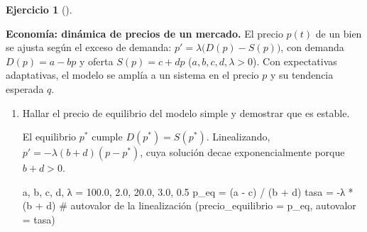 \documentclass[
  spanish,
  a4paper,
]{scrreport}
\newenvironment{Shaded}{\begin{snugshade}}{\end{snugshade}}
\newcommand{\CommentTok}[1]{\textcolor[rgb]{0.37,0.37,0.37}{#1}}
\newcommand{\FloatTok}[1]{\textcolor[rgb]{0.68,0.00,0.00}{#1}}
\newcommand{\NormalTok}[1]{\textcolor[rgb]{0.00,0.23,0.31}{#1}}
\newcommand{\OperatorTok}[1]{\textcolor[rgb]{0.37,0.37,0.37}{#1}}
\theoremstyle{definition}
\newtheorem{exercise}{Ejercicio}[chapter]
\theoremstyle{remark}
\begin{document}
\begin{exercise}[]\protect\hypertarget{exr-dinamica-mercado}{}\label{exr-dinamica-mercado}

\textbf{Economía: dinámica de precios de un mercado.} El precio \(p(t)\)
de un bien se ajusta según el exceso de demanda:
\(p' = \lambda\big(D(p) - S(p)\big)\), con demanda \(D(p) = a - b p\) y
oferta \(S(p) = c + d p\) (\(a,b,c,d,\lambda > 0\)). Con expectativas
adaptativas, el modelo se amplía a un sistema en el precio \(p\) y su
tendencia esperada \(q\).

\begin{enumerate}
\def\labelenumi{\alph{enumi}.}
\item
  Hallar el precio de equilibrio del modelo simple y demostrar que es
  estable.

  \begin{tcolorbox}[enhanced jigsaw, arc=.35mm, bottomrule=.15mm, bottomtitle=1mm, breakable, colback=white, colbacktitle=quarto-callout-note-color!10!white, colframe=quarto-callout-note-color-frame, coltitle=black, left=2mm, leftrule=.75mm, opacityback=0, opacitybacktitle=0.6, rightrule=.15mm, title=\textcolor{quarto-callout-note-color}{\faInfo}\hspace{0.5em}{Ayuda}, titlerule=0mm, toprule=.15mm, toptitle=1mm]

  El equilibrio \(p^*\) cumple \(D(p^*) = S(p^*)\). Linealizando,
  \(p' = -\lambda(b+d)(p - p^*)\), cuya solución decae exponencialmente
  porque \(b + d > 0\).

  \end{tcolorbox}

  \begin{tcolorbox}[enhanced jigsaw, arc=.35mm, bottomrule=.15mm, bottomtitle=1mm, breakable, colback=white, colbacktitle=quarto-callout-tip-color!10!white, colframe=quarto-callout-tip-color-frame, coltitle=black, left=2mm, leftrule=.75mm, opacityback=0, opacitybacktitle=0.6, rightrule=.15mm, title=\textcolor{quarto-callout-tip-color}{\faLightbulb}\hspace{0.5em}{Solución}, titlerule=0mm, toprule=.15mm, toptitle=1mm]

\begin{Shaded}
\begin{Highlighting}[]
\NormalTok{a, b, c, d, λ }\OperatorTok{=} \FloatTok{100.0}\NormalTok{, }\FloatTok{2.0}\NormalTok{, }\FloatTok{20.0}\NormalTok{, }\FloatTok{3.0}\NormalTok{, }\FloatTok{0.5}
\NormalTok{p\_eq }\OperatorTok{=}\NormalTok{ (a }\OperatorTok{{-}}\NormalTok{ c) }\OperatorTok{/}\NormalTok{ (b }\OperatorTok{+}\NormalTok{ d)}
\NormalTok{tasa }\OperatorTok{=} \OperatorTok{{-}}\NormalTok{λ }\OperatorTok{*}\NormalTok{ (b }\OperatorTok{+}\NormalTok{ d)          }\CommentTok{\# autovalor de la linealización}
\NormalTok{(precio\_equilibrio }\OperatorTok{=}\NormalTok{ p\_eq, autovalor }\OperatorTok{=}\NormalTok{ tasa)}
\end{Highlighting}
\end{Shaded}


\end{tcolorbox}
\end{enumerate}
\end{exercise}
\end{document}
